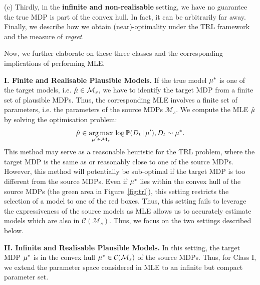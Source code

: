 (c) Thirdly, in the \textbf{infinite and non-realisable} setting, we have no guarantee the true MDP is part of the convex hull. In fact, it can be arbitrarily far away. Finally, we describe how we obtain (near)-optimality under the TRL framework and the measure of \emph{regret}.
\fi

Now, we further elaborate on these three classes and the corresponding implications of performing MLE.

\textbf{I. Finite and Realisable Plausible Models.}\label{subsec:finite}
If the true model $\mu^{*}$ is one of the target models, i.e. $\hat{\mu} \in \mathcal{M}_s$, we have to identify the target MDP from a finite set of plausible MDPs. Thus, the corresponding MLE involves a finite set of parameters, i.e. the parameters of the source MDPs $\mathcal{M}_s$. We compute the MLE $\hat{\mu}$ by solving the optimisation problem:
\begin{equation}
    \hat{\mu} \in \underset{\mu' \in \mathcal{M}_s}{\arg\max} \, \log \mathbb{P}(D_t \, | \, \mu'), D_t \sim \mu^{*}.
\end{equation}
This method may serve as a reasonable heuristic for the TRL problem, where the target MDP is the same as or reasonably close to one of the source MDPs. However, this method will potentially be sub-optimal if the target MDP is too different from the source MDPs. %
Even if $\mu^{*}$ lies within the convex hull of the source MDPs (the green area in Figure~\ref{fig:trl}), this setting restricts the selection of a model to one of the red boxes. Thus, this setting fails to leverage the expressiveness of the source models as MLE allows us to accurately estimate models which are also in $\mathcal{C}(\mathcal{M}_s)$. Thus, we focus on the two settings described below.

\textbf{II. Infinite and Realisable Plausible Models.}\label{subsec:realisable}
In this setting, the target MDP $\mu^{*}$ is in the convex hull $\mu^{*} \in \mathcal{C}(\mathcal{M}_s)$ of the source MDPs. Thus, for Class I, we extend the parameter space considered in MLE to an infinite but compact parameter set. 

